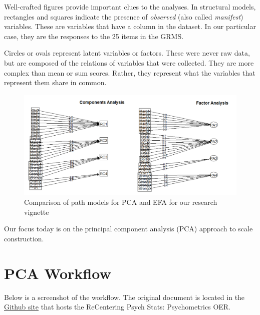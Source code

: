 \documentclass[
  english,
]{book}
\begin{document}
Well-crafted figures provide important clues to the analyses. In structural models, rectangles and squares indicate the presence of \emph{observed} (also called \emph{manifest}) variables. These are variables that have a column in the dataset. In our particular case, they are the responses to the 25 items in the GRMS.

Circles or ovals represent latent variables or factors. These were never raw data, but are composed of the relations of variables that were collected. They are more complex than mean or sum scores. Rather, they represent what the variables that represent them share in common.

\begin{figure}
\centering
\includegraphics{images/PCA/PCAvPAF.png}
\caption{Comparison of path models for PCA and EFA for our research vignette}
\end{figure}

Our focus today is on the principal component analysis (PCA) approach to scale construction.

\hypertarget{pca-workflow}{%
\section{PCA Workflow}\label{pca-workflow}}

Below is a screenshot of the workflow. The original document is located in the \href{https://github.com/lhbikos/ReC_Psychometrics}{Github site} that hosts the ReCentering Psych Stats: Psychometrics OER.
\end{document}
